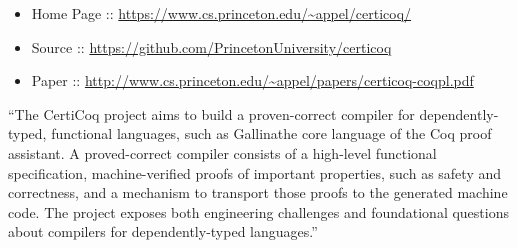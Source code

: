 \documentclass[12pt,twoside]{article}
\begin{document}
\begin{itemize}[noitemsep,topsep=\mdcompacttopsep]%

\item{}Home Page :: \href{https://www.cs.princeton.edu/~appel/certicoq/}{{\ttfamily https://\hspace{0pt}www.\hspace{0pt}cs.\hspace{0pt}princeton.\hspace{0pt}edu/\hspace{0pt}\textasciitilde{}appel/\hspace{0pt}certicoq/\hspace{0pt}}}%

\item{}Source :: \href{https://github.com/PrincetonUniversity/certicoq}{{\ttfamily https://\hspace{0pt}github.\hspace{0pt}com/\hspace{0pt}PrincetonUniversity/\hspace{0pt}certicoq}}%

\item{}Paper :: \href{http://www.cs.princeton.edu/~appel/papers/certicoq-coqpl.pdf}{{\ttfamily http://\hspace{0pt}www.\hspace{0pt}cs.\hspace{0pt}princeton.\hspace{0pt}edu/\hspace{0pt}\textasciitilde{}appel/\hspace{0pt}papers/\hspace{0pt}certicoq-\hspace{0pt}coqpl.\hspace{0pt}pdf}}%
\end{itemize}%

\noindent{}\textquotedblleft{}The CertiCoq project aims to build a proven-correct compiler for
dependently-typed, functional languages, such as Gallinathe core
language of the Coq proof assistant. A proved-correct compiler
consists of a high-level functional specification, machine-verified
proofs of important properties, such as safety and correctness, and a
mechanism to transport those proofs to the generated machine code. The
project exposes both engineering challenges and foundational questions
about compilers for dependently-typed languages.\textquotedblright{}%
\end{document}
